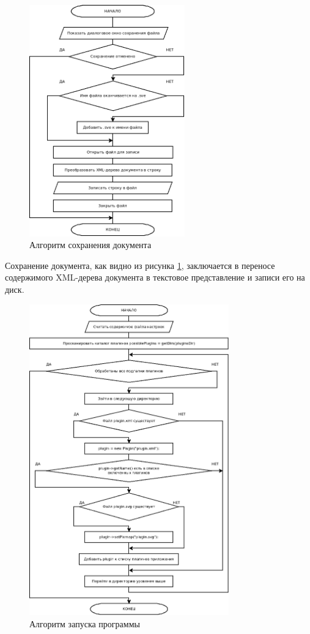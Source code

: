 \begin{figure}[H]
  \centering
  \includegraphics[width=0.6\textwidth]{diagrams/block-schemes/save.png}
  \caption{Алгоритм сохранения документа}
  \label{fig:save-file}
\end{figure}

Сохранение документа, как видно из рисунка \ref{fig:save-file}, заключается в переносе содержимого XML-дерева документа в текстовое представление и записи его на диск.

\begin{figure}[H]
  \centering
  \includegraphics[width=0.77\textwidth]{diagrams/block-schemes/start.png}
  \caption{Алгоритм запуска программы}
  \label{fig:start}
\end{figure}


